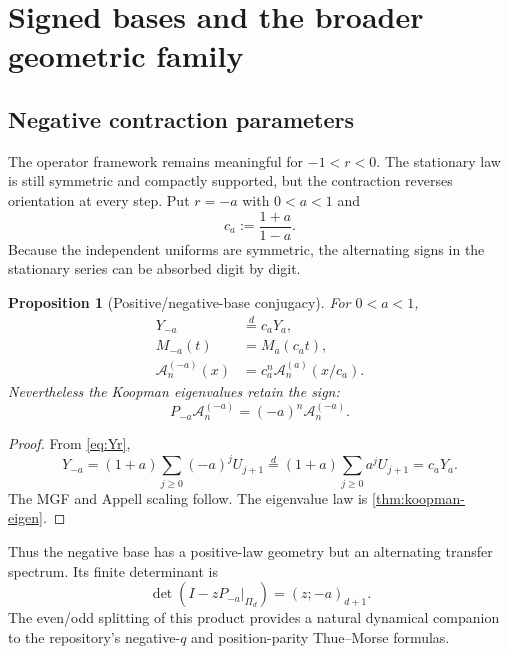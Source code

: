 \documentclass[11pt,a4paper]{article}
\newtheorem{proposition}[theorem]{Proposition}
\theoremstyle{definition}
\theoremstyle{remark}
\newcommand{\Acal}{\mathcal A}
\begin{document}
\section{Signed bases and the broader geometric family}
\label{sec:signed-bases}

\subsection{Negative contraction parameters}

The operator framework remains meaningful for $-1<r<0$. The stationary law is still symmetric and compactly supported, but the contraction reverses orientation at every step. Put $r=-a$ with $0<a<1$ and
\begin{equation}
 c_a:=\frac{1+a}{1-a}.
 \label{eq:ca}
\end{equation}
Because the independent uniforms are symmetric, the alternating signs in the stationary series can be absorbed digit by digit.

\begin{proposition}[Positive/negative-base conjugacy]
\label{prop:negative-conjugacy}
For $0<a<1$,
\begin{align}
 Y_{-a}&\stackrel d=c_aY_a,
 \label{eq:Y-negative-scale}\\
 M_{-a}(t)&=M_a(c_at),
 \label{eq:M-negative-scale}\\
 \Acal_{n}^{(-a)}(x)&=c_a^n\Acal_n^{(a)}(x/c_a).
 \label{eq:A-negative-scale}
\end{align}
Nevertheless the Koopman eigenvalues retain the sign:
\begin{equation}
 P_{-a}\Acal_n^{(-a)}=(-a)^n\Acal_n^{(-a)}.
 \label{eq:negative-eigen}
\end{equation}
\end{proposition}

\begin{proof}
From \eqref{eq:Yr},
\[
 Y_{-a}=(1+a)\sum_{j\ge0}(-a)^jU_{j+1}
 \stackrel d=(1+a)\sum_{j\ge0}a^jU_{j+1}=c_aY_a.
\]
The MGF and Appell scaling follow. The eigenvalue law is \cref{thm:koopman-eigen}.
\end{proof}

Thus the negative base has a positive-law geometry but an alternating transfer spectrum. Its finite determinant is
\begin{equation}
 \det(I-zP_{-a}\vert_{\Pi_d})=(z;-a)_{d+1}.
 \label{eq:negative-det}
\end{equation}
The even/odd splitting of this product provides a natural dynamical companion to the repository's negative-$q$ and position-parity Thue--Morse formulas.
\end{document}
